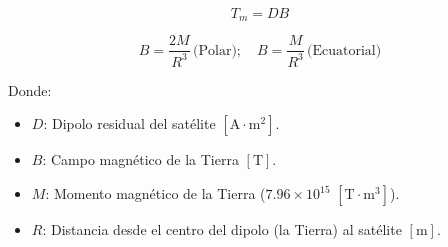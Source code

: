\[
T_m = D B
\]

\[
B = \frac{2M}{R^3} \, \text{(Polar)}; \quad B = \frac{M}{R^3} \, \text{(Ecuatorial)}
\]

Donde:
\begin{itemize}
	\item $D$: Dipolo residual del satélite $[\text{A} \cdot \text{m}^2]$.
	\item $B$: Campo magnético de la Tierra $[\text{T}]$.
	\item $M$: Momento magnético de la Tierra ($7.96 \times 10^{15}$ $[\text{T} \cdot \text{m}^3]$).
	\item $R$: Distancia desde el centro del dipolo (la Tierra) al satélite $[\text{m}]$.
\end{itemize}